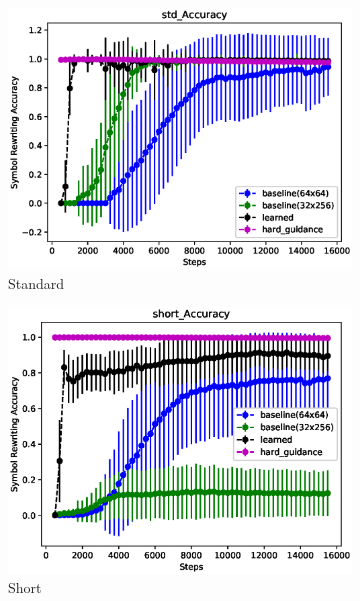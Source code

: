 \begin{figure}[H]
	\begin{subfigure}{0.5\linewidth}
		\includegraphics[width=0.95\linewidth]{./figs/sr/std-acc-eps}
		\caption{Standard}\label{std-acc}
	\end{subfigure}
	\begin{subfigure}{0.5\linewidth}
		\includegraphics[width=0.95\linewidth]{./figs/sr/short-acc-eps}
		\caption{Short}\label{short-acc}
	\end{subfigure}
	\begin{subfigure}{0.5\linewidth}

\end{subfigure}
\end{figure}
